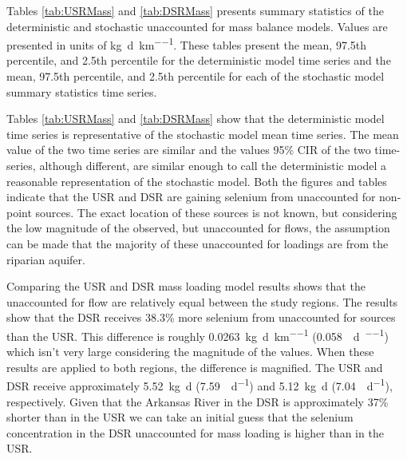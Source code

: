\begin{linenumbers}
Tables \ref{tab:USRMass} and \ref{tab:DSRMass} presents summary statistics of the deterministic and stochastic unaccounted for mass balance models.  Values are presented in units of \si{\kilo\gram\per\day\per\kilo\meter}.  These tables present the mean, 97.5th percentile, and 2.5th percentile for the deterministic model time series and the mean, 97.5th percentile, and 2.5th percentile for each of the stochastic model summary statistics time series.

\subtabletop
\begin{table}[htbp]
	\centering
	\caption[USR deterministic and stochastic dissolved selenium unaccounted for loading time-series results tables.]{USR deterministic and stochastic dissolved selenium unaccounted for loading time-series results tables.  Values are in units of \si{\kilo\gram\per\day\per\kilo\meter}.}
	\label{tab:USRMass}
	
	\tablevspace
\end{table}
\begin{table}[htbp]
	\centering
	\caption[DSR deterministic and stochastic dissolved selenium unaccounted for loading time-series results tables.]{DSR deterministic and stochastic dissolved selenium unaccounted for loading time-series results tables.  Values are in units of \si{\kilo\gram\per\day\per\kilo\meter}.}
	\label{tab:DSRMass}
	
\end{table}

Tables \ref{tab:USRMass} and \ref{tab:DSRMass} show that the deterministic model time series is representative of the stochastic model mean time series.  The mean value of the two time series are similar and the values 95\% CIR of the two time-series, although different, are similar enough to call the deterministic model a reasonable representation of the stochastic model.  Both the figures and tables indicate that the USR and DSR are gaining selenium from unaccounted for non-point sources.  The exact location of these sources is not known, but considering the low magnitude of the observed, but unaccounted for flows, the assumption can be made that the majority of these unaccounted for loadings are from the riparian aquifer.

Comparing the USR and DSR mass loading model results shows that the unaccounted for flow are relatively equal between the study regions.  The results show that the DSR receives 38.3\% more selenium from unaccounted for sources than the USR.  This difference is roughly \SI{0.0263}{\kilo\g\per\day\per\kilo\m} (\SI{0.058}{\pound\per\day\per\mile}) which isn't very large considering the magnitude of the values. When these results are applied to both regions, the difference is magnified.  The USR and DSR receive approximately \SI{5.52}{\kilo\g\day} (\SI{7.59}{\pound\per\day}) and \SI{5.12}{\kilo\g\day} (\SI{7.04}{\pound\per\day}), respectively.  Given that the Arkansas River in the DSR is approximately 37\% shorter than in the USR we can take an initial guess that the selenium concentration in the DSR unaccounted for mass loading is higher than in the USR.


\end{linenumbers}
